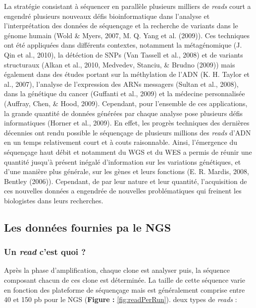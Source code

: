 \documentclass[12pt,twoside]{reedthesis}
\theoremstyle{definition}
\theoremstyle{definition}
\theoremstyle{remark}
\begin{document}
  La stratégie consistant à séquencer en parallèle plusieurs milliers de
  \emph{reads} court a engendré plusieurs nouveaux défis bioinformatique
  dans l'analyse et l'interprétation des données de séquençage et la
  recherche de variants dans le génome humain (Wold \& Myers, 2007, M. Q.
  Yang et al. (2009)). Ces techniques ont été appliquées dans différents
  contextes, notamment la métagénomique (J. Qin et al., 2010), la
  détéction de SNPs (Van Tassell et al., 2008) et de variants structuraux
  (Alkan et al., 2010, Medvedev, Stanciu, \& Brudno (2009)) mais également
  dans des études portant sur la méthylation de l'ADN (K. H. Taylor et
  al., 2007), l'analyse de l'expression des ARNs messagers (Sultan et al.,
  2008), dans la génétique du cancer (Guffanti et al., 2009) et la
  médecine personnalisée (Auffray, Chen, \& Hood, 2009). Cependant, pour
  l'ensemble de ces applications, la grande quantité de données générées
  par chaque analyse pose plusieurs défis informatiques (Horner et al.,
  2009). En effet, les progrès techniques des dernières décennies ont
  rendu possible le séquençage de plusieurs millions des \emph{reads}
  d'ADN en un temps relativement court et à couts raisonnable. Ainsi,
  l'émergence du séquençage haut débit et notamment du WGS et du WES a
  permis de réunir une quantité jusqu'à présent inégalé d'information sur
  les variations génétiques, et d'une manière plus générale, sur les gènes
  et leurs fonctions (E. R. Mardis, 2008, Bentley (2006)). Cependant, de
  par leur nature et leur quantité, l'acquisition de ces nouvelles données
  a engendrée de nouvelles problématiques qui freinent les biologistes
  dans leurs recherches.
  
  \subsection{Les données fournies pa le
  NGS}\label{les-donnees-fournies-pa-le-ngs}
  
  \subsubsection{\texorpdfstring{Un \emph{read} c'est quoi
  ?}{Un read c'est quoi ?}}\label{un-read-cest-quoi}
  
  Après la phase d'amplification, chaque clone est analyser puis, la
  séquence composant chacun de ces clone est déterminée. La taille de
  cette séquence varie en fonction des plateforme de séquençage mais est
  généralement comprise entre 40 et 150 pb pour le NGS (\textbf{Figure :
  }\ref{fig:readPerRun}). deux types de \emph{reads} :
  
\end{document}
